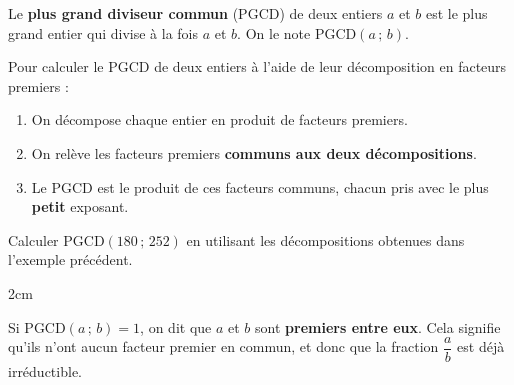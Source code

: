 \documentclass[a4paper]{book}
\begin{document}
    \begin{definition}
        Le \textbf{plus grand diviseur commun} (PGCD) de deux entiers $a$ et $b$ est le plus grand entier qui divise à la fois $a$ et $b$. On le note $\text{PGCD}(a\,;\,b)$.
    \end{definition}

    \begin{methode}
        Pour calculer le PGCD de deux entiers à l'aide de leur décomposition en facteurs premiers :
        \begin{enumerate}
            \item On décompose chaque entier en produit de facteurs premiers.
            \item On relève les facteurs premiers \textbf{communs aux deux décompositions}.
            \item Le PGCD est le produit de ces facteurs communs, chacun pris avec le plus \textbf{petit} exposant.
        \end{enumerate}
    \end{methode}

    \begin{exemple}
        Calculer $\text{PGCD}(180\,;\,252)$ en utilisant les décompositions obtenues dans l'exemple précédent.
        \begin{ZoneReponse}{2cm}
        \end{ZoneReponse}
    \end{exemple}

    \begin{remarque}
        Si $\text{PGCD}(a\,;\,b) = 1$, on dit que $a$ et $b$ sont \textbf{premiers entre eux}. Cela signifie qu'ils n'ont aucun facteur premier en commun, et donc que la fraction $\dfrac{a}{b}$ est déjà irréductible.
    \end{remarque}
\end{document}
